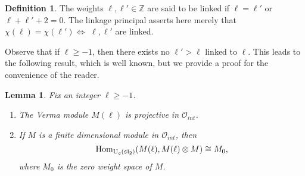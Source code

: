 \documentclass[12pt]{amsart}
\newtheorem{lemma}[theorem]{Lemma}
\theoremstyle{definition}
\newtheorem{definition}[theorem]{Definition}
\theoremstyle{remark}
\numberwithin{equation}{section}
\newcommand{\Z}{{\mathbb Z}}
\newcommand{\CO}{{\mathcal O}}
\newcommand{\U}{{\rm{U}}}
\newcommand{\Hom}{{\rm{Hom}}}
\newcommand{\fsl}{{\mathfrak {sl}}}
\begin{document}
\begin{definition}\label{def:link}
The weights $\ell,\ell'\in\Z$ are said to be linked if $\ell=\ell'$ or $\ell+\ell'+2=0$. The linkage principal asserts here merely
that $\chi(\ell)=\chi(\ell')\iff$ $\ell,\ell'$ are linked.
\end{definition}

Observe that if $\ell\ge -1$, then there exists no $\ell'>\ell$ linked to $\ell$. 
This leads to the following result, which is well known, but we provide a proof for the convenience of the reader.

\begin{lemma} \label{lem:proj} Fix an integer $\ell\ge -1$.
\begin{enumerate}
\item The Verma module $M(\ell)$ is projective in $\CO_{int}$. 
\item If $M$ is a finite dimensional module in $\CO_{int}$, then
\[
\Hom_{\U_q(\fsl_2)}(M(\ell), M(\ell)\otimes M) \cong M_0, 
\]
where $M_0$ is the zero weight space of $M$. 
\end{enumerate}
\end{lemma}
\end{document}
